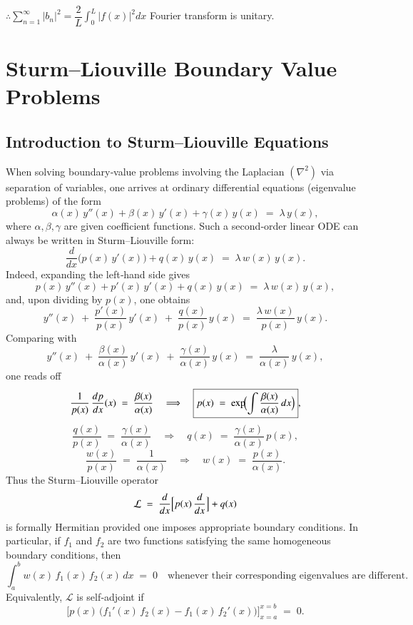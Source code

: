 \documentclass{report}
\begin{document}
$\therefore \sum\limits_{n=1}^{\infty}\left|b_{n}\right|^{2}=\dfrac{2}{L} \displaystyle\int_{0}^{L}|f(x)|^{2} d x$ \quad Fourier transform is unitary.


\chapter{Sturm–Liouville Boundary Value Problems}

\section{Introduction to Sturm–Liouville Equations}

When solving boundary‐value problems involving the Laplacian \( (\nabla^{2}) \) via separation of variables, one arrives at ordinary differential equations (eigenvalue problems) of the form
\[
\alpha(x)\,y''(x) + \beta(x)\,y'(x) + \gamma(x)\,y(x) \;=\; \lambda\,y(x),
\]
where \(\alpha,\beta,\gamma\) are given coefficient functions.  Such a second‐order linear ODE can always be written in Sturm–Liouville form:
\[
\frac{d}{dx}\bigl(p(x)\,y'(x)\bigr) + q(x)\,y(x) \;=\; \lambda\,w(x)\,y(x).
\]
Indeed, expanding the left‐hand side gives
\[
p(x)\,y''(x) + p'(x)\,y'(x) + q(x)\,y(x) \;=\; \lambda\,w(x)\,y(x),
\]
and, upon dividing by \(p(x)\), one obtains
\[
y''(x) \;+\; \frac{p'(x)}{p(x)}\,y'(x) \;+\; \frac{q(x)}{p(x)}\,y(x) \;=\; \frac{\lambda\,w(x)}{p(x)}\,y(x).
\]
Comparing with
\[
y''(x) \;+\; \frac{\beta(x)}{\alpha(x)}\,y'(x) \;+\; \frac{\gamma(x)}{\alpha(x)}\,y(x) \;=\; \frac{\lambda}{\alpha(x)}\,y(x),
\]
one reads off
\[
\frac{1}{p(x)}\,\frac{dp}{dx}(x) \;=\; \frac{\beta(x)}{\alpha(x)} 
\quad\Longrightarrow\quad
\boxed{p(x) \;=\; \exp\!\Bigl(\int \frac{\beta(x)}{\alpha(x)}\,dx\Bigr)},
\]
\[
\frac{q(x)}{p(x)} \;=\; \frac{\gamma(x)}{\alpha(x)}
\quad\Longrightarrow\quad
\boxed{q(x) \;=\; \frac{\gamma(x)}{\alpha(x)}\,p(x)},
\]
\[
\frac{w(x)}{p(x)} \;=\; \frac{1}{\alpha(x)}
\quad\Longrightarrow\quad
\boxed{w(x) \;=\; \frac{p(x)}{\alpha(x)}}.
\]
Thus the Sturm–Liouville operator
\[
\mathcal{L}\;=\;\frac{d}{dx}\Bigl[p(x)\,\frac{d}{dx}\Bigr] + q(x)
\]
is formally Hermitian provided one imposes appropriate boundary conditions.  In particular, if \(f_{1}\) and \(f_{2}\) are two functions satisfying the same homogeneous boundary conditions, then
\[
\int_{a}^{b} w(x)\,f_{1}(x)\,f_{2}(x)\,dx \;=\; 0
\quad\text{whenever their corresponding eigenvalues are different.}
\]
Equivalently, \(\mathcal{L}\) is self‐adjoint if
\[
\bigl[p(x)\,\bigl(f_{1}'(x)\,f_{2}(x) - f_{1}(x)\,f_{2}'(x)\bigr)\bigr]_{x=a}^{x=b}
\;=\; 0.
\]
\end{document}
